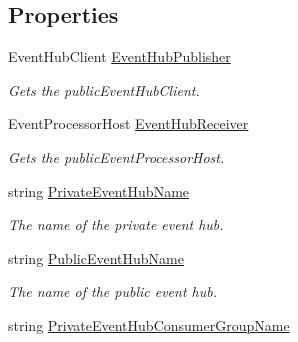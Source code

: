 \subsection*{Properties}
\begin{DoxyCompactItemize}
\item 
Event\+Hub\+Client \hyperlink{classCqrs_1_1Azure_1_1ServiceBus_1_1AzureEventHub_a5f64ce36efaee0f676816c803620d05e_a5f64ce36efaee0f676816c803620d05e}{Event\+Hub\+Publisher}
\begin{DoxyCompactList}\small\item\em Gets the publicEvent\+Hub\+Client. \end{DoxyCompactList}\item 
Event\+Processor\+Host \hyperlink{classCqrs_1_1Azure_1_1ServiceBus_1_1AzureEventHub_a1b12b47dbb9b9afe2014477a2e457c35_a1b12b47dbb9b9afe2014477a2e457c35}{Event\+Hub\+Receiver}
\begin{DoxyCompactList}\small\item\em Gets the publicEvent\+Processor\+Host. \end{DoxyCompactList}\item 
string \hyperlink{classCqrs_1_1Azure_1_1ServiceBus_1_1AzureEventHub_ac6802047e00a92ea4b0ae6b69ef7310a_ac6802047e00a92ea4b0ae6b69ef7310a}{Private\+Event\+Hub\+Name}
\begin{DoxyCompactList}\small\item\em The name of the private event hub. \end{DoxyCompactList}\item 
string \hyperlink{classCqrs_1_1Azure_1_1ServiceBus_1_1AzureEventHub_a6012f2290f9397929e9d6d5419963482_a6012f2290f9397929e9d6d5419963482}{Public\+Event\+Hub\+Name}
\begin{DoxyCompactList}\small\item\em The name of the public event hub. \end{DoxyCompactList}\item 
string \hyperlink{classCqrs_1_1Azure_1_1ServiceBus_1_1AzureEventHub_a0c091d0cb19dda3e8bfc20f0e7d30af3_a0c091d0cb19dda3e8bfc20f0e7d30af3}{Private\+Event\+Hub\+Consumer\+Group\+Name}

\end{DoxyCompactItemize}
